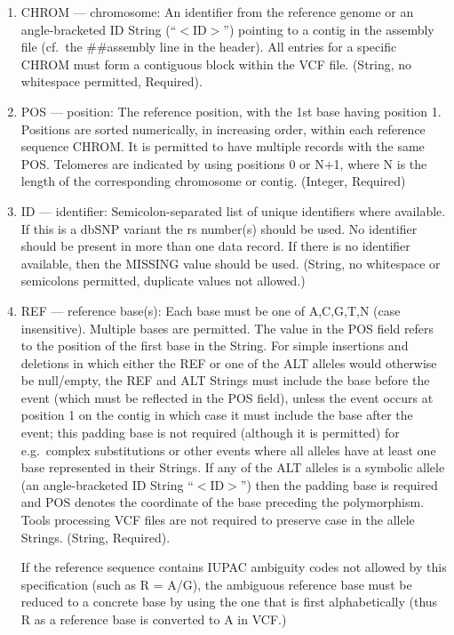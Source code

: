 \documentclass[8pt]{article}
\begin{document}
\begin{enumerate}
  \item CHROM --- chromosome: An identifier from the reference genome or an angle-bracketed ID String (``$<$ID$>$'') pointing to a contig in the assembly file (cf.\ the \#\#assembly line in the header).
  All entries for a specific CHROM must form a contiguous block within the VCF file.
  (String, no whitespace permitted, Required).
  \item POS --- position: The reference position, with the 1st base having position 1.
  Positions are sorted numerically, in increasing order, within each reference sequence CHROM.
  It is permitted to have multiple records with the same POS.
  Telomeres are indicated by using positions 0 or N+1, where N is the length of the corresponding chromosome or contig.
  (Integer, Required)
  \item ID --- identifier: Semicolon-separated list of unique identifiers where available.
  If this is a dbSNP variant the rs number(s) should be used.
  No identifier should be present in more than one data record.
  If there is no identifier available, then the MISSING value should be used.
  (String, no whitespace or semicolons permitted, duplicate values not allowed.)
  \item REF --- reference base(s): Each base must be one of A,C,G,T,N (case insensitive).
  Multiple bases are permitted.
  The value in the POS field refers to the position of the first base in the String.
  For simple insertions and deletions in which either the REF or one of the ALT alleles would otherwise be null/empty, the REF and ALT Strings must include the base before the event (which must be reflected in the POS field), unless the event occurs at position 1 on the contig in which case it must include the base after the event; \pagebreak[1] this padding base is not required (although it is permitted) for e.g.\ complex substitutions or other events where all alleles have at least one base represented in their Strings.
  If any of the ALT alleles is a symbolic allele (an angle-bracketed ID String ``$<$ID$>$'') then the padding base is required and POS denotes the coordinate of the base preceding the polymorphism.
  Tools processing VCF files are not required to preserve case in the allele Strings. (String, Required).

  If the reference sequence contains IUPAC ambiguity codes not allowed by this specification (such as R = A/G), the ambiguous reference base must be reduced to a concrete base by using the one that is first alphabetically (thus R as a reference base is converted to A in VCF.)


\end{enumerate}
\end{document}

